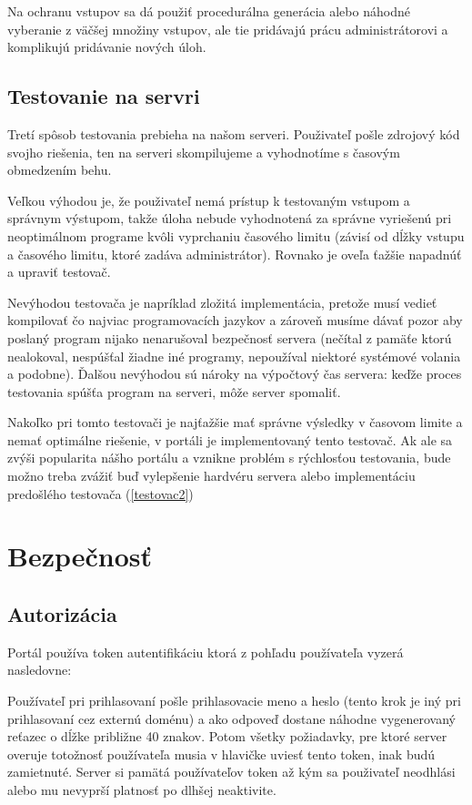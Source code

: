 Na ochranu vstupov sa dá použiť procedurálna generácia alebo náhodné vyberanie z väčšej množiny vstupov, ale tie pridávajú prácu administrátorovi a komplikujú pridávanie nových úloh.

\subsection{Testovanie na servri}
Tretí spôsob testovania prebieha na našom serveri. Použivateľ pošle zdrojový kód svojho riešenia, ten na serveri skompilujeme a vyhodnotíme s časovým obmedzením behu.

Veľkou výhodou je, že použivateľ nemá prístup k testovaným vstupom a správnym výstupom, takže úloha nebude vyhodnotená za správne vyriešenú pri neoptimálnom programe kvôli vyprchaniu časového limitu (závisí od dĺžky vstupu a časového limitu, ktoré zadáva administrátor). Rovnako je oveľa ťažšie napadnúť a upraviť testovač.

Nevýhodou testovača je napríklad zložitá implementácia, pretože musí vedieť kompilovať čo najviac programovacích jazykov a zároveň musíme dávať pozor aby poslaný program nijako nenarušoval bezpečnosť servera (nečítal z pamäťe ktorú nealokoval, nespúšťal žiadne iné programy, nepoužíval niektoré systémové volania a podobne). Ďalšou nevýhodou sú nároky na výpočtový čas servera: keďže proces testovania spúšťa program na serveri, môže server spomaliť.

Nakoľko pri tomto testovači je najťažšie mať správne výsledky v časovom limite a nemať optimálne riešenie, v portáli je implementovaný tento testovač. Ak ale sa zvýši popularita nášho portálu a vznikne problém s rýchlosťou testovania, bude možno treba zvážiť buď vylepšenie hardvéru servera alebo implementáciu predošlého testovača (\ref{testovac2})

\section{Bezpečnosť}
\subsection{Autorizácia}
\label{authorization}
Portál používa token autentifikáciu ktorá z pohľadu používateľa vyzerá nasledovne:

Používateľ pri prihlasovaní pošle prihlasovacie meno a heslo (tento krok je iný pri prihlasovaní cez externú doménu) a ako odpoveď
dostane náhodne vygenerovaný reťazec o dĺžke približne 40 znakov. Potom všetky požiadavky, pre ktoré server overuje totožnosť používateľa
 musia v hlavičke uviesť tento token, inak budú zamietnuté.
Server si pamätá používateľov token až kým sa použivateľ neodhlási alebo mu nevyprší platnosť po dlhšej neaktivite.


